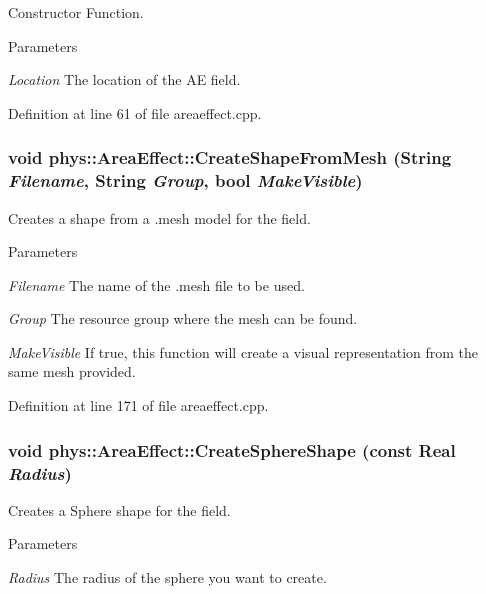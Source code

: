 Constructor Function. 


\begin{DoxyParams}{Parameters}
\item[{\em Location}]The location of the AE field. \end{DoxyParams}


Definition at line 61 of file areaeffect.cpp.

\hypertarget{classphys_1_1AreaEffect_a129cfe777f13ea62727f684761778bcb}{
\subsubsection[{CreateShapeFromMesh}]{\setlength{\rightskip}{0pt plus 5cm}void phys::AreaEffect::CreateShapeFromMesh ({\bf String} {\em Filename}, \/  {\bf String} {\em Group}, \/  bool {\em MakeVisible})}}
\label{d4/d55/classphys_1_1AreaEffect_a129cfe777f13ea62727f684761778bcb}


Creates a shape from a .mesh model for the field. 


\begin{DoxyParams}{Parameters}
\item[{\em Filename}]The name of the .mesh file to be used. \item[{\em Group}]The resource group where the mesh can be found. \item[{\em MakeVisible}]If true, this function will create a visual representation from the same mesh provided. \end{DoxyParams}


Definition at line 171 of file areaeffect.cpp.

\hypertarget{classphys_1_1AreaEffect_a57399254f84ac288f74033ab609d8ffc}{
\subsubsection[{CreateSphereShape}]{\setlength{\rightskip}{0pt plus 5cm}void phys::AreaEffect::CreateSphereShape (const {\bf Real} {\em Radius})}}
\label{d4/d55/classphys_1_1AreaEffect_a57399254f84ac288f74033ab609d8ffc}


Creates a Sphere shape for the field. 


\begin{DoxyParams}{Parameters}
\item[{\em Radius}]The radius of the sphere you want to create. \end{DoxyParams}


